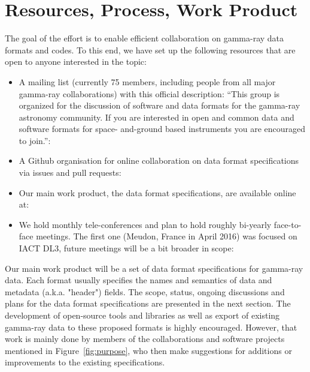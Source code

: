 \section{Resources, Process, Work Product}

The goal of the \gadf effort is to enable efficient collaboration on gamma-ray data formats and codes. To this end, we have set up the following resources that are open to anyone interested in the topic:

\begin{itemize}
\item{} A mailing list (currently 75 members, including people from all major gamma-ray collaborations) with this official description: ``This group is organized for the discussion of software and data formats for the gamma-ray astronomy community. If you are interested in open and common data and software formats for space- and-ground based instruments you are encouraged to join.'': \\ \ogralist
\item{}A Github organisation for online collaboration on data format specifications via issues and pull requests:\\ \gadfgithub
\item{}Our main work product, the data format specifications, are available online at:\\ \gadfrtd
\item{}We hold monthly tele-conferences and plan to hold roughly bi-yearly face-to-face meetings. The first one (Meudon, France in April 2016) was focused on IACT DL3, future meetings will be a bit broader in scope: \ogrameudon
\end{itemize}

Our main work product will be a set of data format specifications for gamma-ray data. Each format usually specifies the names and semantics of data and metadata (a.k.a. "header") fields. The scope, status, ongoing discussions and plans for the data format specifications are presented in the next section. The development of open-source tools and libraries as well as export of existing gamma-ray data to these proposed formats is highly encouraged. However, that work is mainly done by members of the collaborations and software projects mentioned in Figure~\ref{fig:purpose}, who then make suggestions for additions or improvements to the existing specifications.

